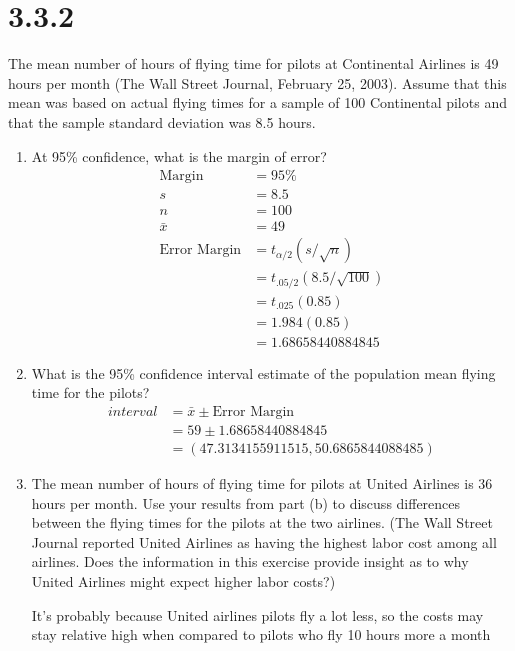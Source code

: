\documentclass{article}
\begin{document}
\section*{3.3.2}
The mean number of hours of flying time for pilots at Continental Airlines is 49 hours per month (The Wall Street Journal, February 25, 2003). Assume that this mean was based on actual flying times for a sample of 100 Continental pilots and that the sample standard deviation was 8.5 hours.
\begin{enumerate}
  \item At 95\% confidence, what is the margin of error?
  \begin{align*}
    \text{Margin} &= 95\%\\
    s &= 8.5\\
    n &= 100\\
    \bar{x} &= 49\\
    \text{Error Margin} &= t_{\alpha/2}(s/ \sqrt{n})\\
    &=t_{.05/2}(8.5/ \sqrt{100})\\
    &=t_{.025}(0.85)\\
    &=1.984(0.85)\\
    &=1.68658440884845
  \end{align*}

  \item What is the 95\% confidence interval estimate of the population mean flying time for the pilots?
  \begin{align*}
    interval &= \bar{x} \pm \text{Error Margin}\\
    &= 59 \pm 1.68658440884845\\
    &= (47.3134155911515, 50.6865844088485 )
  \end{align*}

  \item The mean number of hours of flying time for pilots at United Airlines is 36 hours per month. Use your results from part (b) to discuss differences between the flying times for the pilots at the two airlines. (The Wall Street Journal reported United Airlines as having the highest labor cost among all airlines. Does the information in this exercise provide insight as to why United Airlines might expect higher labor costs?)
  
  It's probably because United airlines pilots fly a lot less, so the costs may stay relative high when compared to pilots who fly 10 hours more a month
\end{enumerate}
\end{document}
